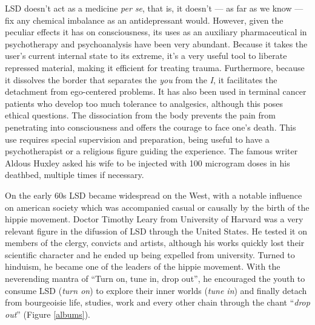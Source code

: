 LSD doesn't act as a medicine \textit{per se}, that is, it doesn't --- as far as we know --- fix any chemical imbalance as an antidepressant would. However, given the peculiar effects it has on consciousness, its uses as an auxiliary pharmaceutical in psychotherapy and psychoanalysis have been very abundant. Because it takes the user's current internal state to its extreme, it's a very useful tool to liberate repressed material, making it efficient for treating trauma. Furthermore, because it dissolves the border that separates the \textit{you} from the \textit{I}, it facilitates the detachment from ego-centered problems. It has also been used in terminal cancer patients who develop too much tolerance to analgesics, although this poses ethical questions. The dissociation from the body prevents the pain from penetrating into consciousness and offers the courage to face one's death. This use requires special supervision and preparation, being useful to have a psychotherapist or a religious figure guiding the experience. The famous writer Aldous Huxley asked his wife to be injected with 100 microgram doses in his deathbed, multiple times if necessary.

On the early 60s LSD became widespread on the West, with a notable influence on american society which was accompanied casual or causally by the birth of the hippie movement. Doctor Timothy Leary from University of Harvard was a very relevant figure in the difussion of LSD through the United States. He tested it on members of the clergy, convicts and artists, although his works quickly lost their scientific character and he ended up being expelled from university. Turned to hinduism, he became one of the leaders of the hippie movement. With the neverending mantra of \enquote{Turn on, tune in, drop out}, he encouraged the youth to consume LSD (\textit{turn on}) to explore their inner worlds (\textit{tune in}) and finally detach from bourgeoisie life, studies, work and every other chain through the chant \enquote{\textit{drop out}} (Figure \ref{albums}).

